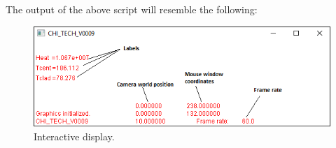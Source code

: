 \documentclass[11pt,letterpaper,titlepage]{article}
\begin{document}
\vspace{0.3cm}
\noindent
The output of the above script will resemble the following:
\noindent
	\begin{center}
		\begin{minipage}[c]{0.85\textwidth}
	
			\begin{figure}[H]
			
				\includegraphics[width=6in]{Interactive.png}
				\caption{Interactive display.}
				\label{figure:Interactive}
			\end{figure}
		\end{minipage}
	\end{center}
\vspace{0.5cm}

	
\end{document}
